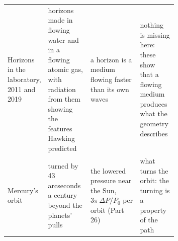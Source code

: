 \documentclass[11pt,a4paper]{article}
\begin{document}
\begin{table}[p]
\begin{tabularx}{\linewidth}{@{}>{\raggedright\arraybackslash}p{0.2\linewidth} >{\raggedright\arraybackslash}p{0.25\linewidth} >{\raggedright\arraybackslash}X >{\raggedright\arraybackslash}p{0.22\linewidth}@{}}
Horizons in the laboratory, 2011 and 2019 & horizons made in flowing water and in a flowing atomic gas, with radiation from them showing the features Hawking predicted & a horizon is a medium flowing faster than its own waves & nothing is missing here: these show that a flowing medium produces what the geometry describes\\
Mercury's orbit & turned by 43 arcseconds a century beyond the planets' pulls & the lowered pressure near the Sun, $3\pi\,\Delta P/P_0$ per orbit (Part 26) & what turns the orbit: the turning is a property of the path\\\bottomrule
\end{tabularx}\label{tab:gravity}\end{table}

\nocite{touboul2022,pound1960,vessot1980,chou2010,dyson1920,shapiro2004,shapiro1964,bertotti2003,everitt2011,abbott2017speed,weinfurtner2011,munoz2019,rashadaPart14,rashadaPart23,rashadaPart26}
\end{document}
